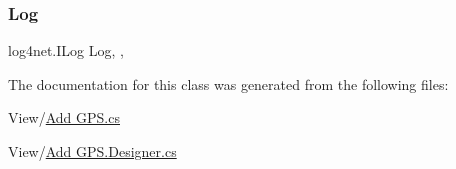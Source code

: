 \subsubsection{\texorpdfstring{Log}{Log}}
{\footnotesize\ttfamily log4net.\+I\+Log Log\hspace{0.3cm}{\ttfamily [static]}, {\ttfamily [get]}, {}}



The documentation for this class was generated from the following files\+:\begin{DoxyCompactItemize}
\item 
View/\hyperlink{Add_01GPS_8cs}{Add G\+P\+S.\+cs}\item 
View/\hyperlink{Add_01GPS_8Designer_8cs}{Add G\+P\+S.\+Designer.\+cs}\end{DoxyCompactItemize}
